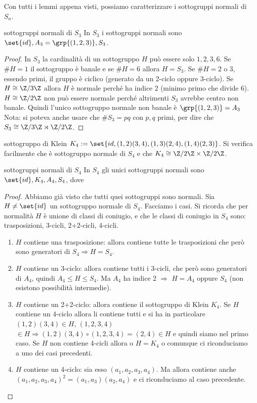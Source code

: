 Con tutti i lemmi appena visti, possiamo caratterizzare i sottogruppi normali di $S_n$.
\begin{example2}{sottogruppi normali di $S_3$}
    In $S_3$ i sottogruppi normali sono $\set{id}, A_3 = \grp{(1,2,3)}, S_3$.
\end{example2}
\begin{proof}
    In $S_3$ la cardinalità di un sottogruppo $H$ può essere solo $1,2,3,6$. Se $\#H = 1$ il sottogruppo è banale e se $\#H = 6$ allora $H = S_3$. Se $\#H = 2$ o $3$, essendo primi, il gruppo è ciclico (generato da un 2-ciclo oppure 3-ciclo). Se $H \cong \Z/3\Z$ allora $H$ è normale perché ha indice 2 (minimo primo che divide 6). $H \cong \Z/2\Z$ non può essere normale perché altrimenti $S_3$ avrebbe centro non banale. Quindi l'unico sottogruppo normale non banale è $\grp{(1,2,3)} = A_3$\\
    Nota: si poteva anche usare che $\#S_3 = pq$ con $p,q$ primi, per dire che $S_3 \cong \Z/3\Z \rtimes \Z/2\Z$.
\end{proof}
\begin{definition}{sottogruppo di Klein}
    $K_4 := \set{id, (1,2)(3,4), (1,3)(2,4), (1,4)(2,3)}$. Si verifica facilmente che è sottogruppo normale di $S_4$ e che $K_4 \cong \Z/2\Z \times \Z/2\Z$.
\end{definition}
\begin{example2}{sottogruppi normali di $S_4$}
    In $S_4$ gli unici sottogruppi normali sono $\set{id}, K_4, A_4, S_4$, dove 
\end{example2}
\begin{proof}
    Abbiamo già visto che tutti quei sottogruppi sono normali. Sia $H \neq \set{id}$ un sottogruppo normale di $S_4$. Facciamo i casi. Si ricorda che per normalità $H$ è unione di classi di coniugio, e che le classi di coniugio in $S_4$ sono: trasposizioni, 3-cicli, 2+2-cicli, 4-cicli.
    \begin{enumerate}
        \item $H$ contiene una trasposizione: allora contiene tutte le trasposizioni che però sono generatori di $S_4 \Rightarrow H = S_4$. 
        \item $H$ contiene un 3-ciclo: allora contiene tutti i 3-cicli, che però sono generatori di $A_4$, quindi $A_4 \leq H \leq S_4$. Ma $A_4$ ha indice 2 $\Rightarrow$ $H = A_4$ oppure $S_4$ (non esistono possibilità intermedie).
        \item $H$ contiene un 2+2-ciclo: allora contiene il sottogruppo di Klein $K_4$. Se $H$ contiene un 4-ciclo allora li contiene tutti e si ha in particolare $(1,2)(3,4) \in H$, $(1,2,3,4)$ $\in H \Rightarrow (1,2)(3,4)\circ(1,2,3,4) = (2,4) \in H$ e quindi siamo nel primo caso. Se $H$ non contiene 4-cicli allora o $H = K_4$ o comunque ci riconduciamo a uno dei casi precedenti.
        \item $H$ contiene un 4-ciclo: sia esso $(a_1,a_2,a_3,a_4)$. Ma allora contiene anche $(a_1,a_2,a_3,a_4)^2 = (a_1,a_3)(a_2,a_4)$ e ci riconduciamo al caso precedente.
    \end{enumerate}
\end{proof}

